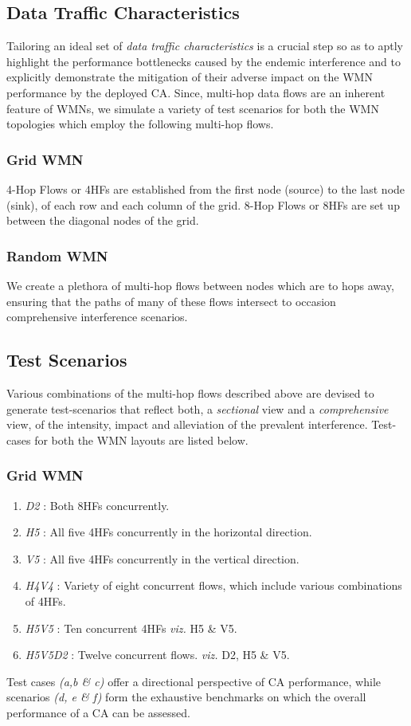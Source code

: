 \documentclass[conference]{IEEEtran}
\begin{document}
\subsection{Data Traffic Characteristics}
Tailoring an ideal set of \textit{data traffic characteristics} is a crucial step so as to aptly highlight the performance bottlenecks caused by the endemic interference and to explicitly demonstrate the mitigation of their adverse impact on the WMN performance by the deployed CA. 
Since, multi-hop data flows are an inherent feature of WMNs, we simulate a variety of test scenarios for both the WMN topologies which employ the following multi-hop flows.
\subsubsection {Grid WMN} 4-Hop Flows or 4HFs are established from the first node (source) to the last node (sink), of each row and each column of the grid. 8-Hop Flows or 8HFs are set up between the diagonal nodes of the grid.  
\subsubsection {Random WMN} We create a plethora of multi-hop flows between nodes which are  to  hops away, ensuring that the paths of many of these flows intersect to occasion comprehensive interference scenarios.

\subsection{Test Scenarios}
Various combinations of the multi-hop flows described above are devised to generate test-scenarios that reflect both, a \textit{sectional} view and a \textit{comprehensive} view, of the intensity, impact and alleviation of the prevalent interference. Test-cases for both the WMN layouts are listed below.
\subsubsection {Grid WMN}
\begin{enumerate}[label=(\alph*)]
 \item \textit{D2} : Both 8HFs  concurrently.
 \item \textit{H5} : All five 4HFs concurrently in the horizontal direction. 
 \item \textit{V5} : All five 4HFs concurrently in the vertical direction. 
\item \textit{H4V4} : Variety of eight concurrent flows, which include various combinations of 4HFs.
 \item \textit{H5V5} : Ten concurrent 4HFs \emph{viz.} H5 \& V5.
 \item \textit{H5V5D2} : Twelve concurrent flows. \emph{viz.} D2, H5 \& V5.
\end{enumerate}
Test cases \textit{(a,b \& c)} offer a directional perspective of CA performance, while scenarios \textit{(d, e \& f)} form the exhaustive benchmarks on which the overall performance of a CA can be assessed.  
\end{document}
